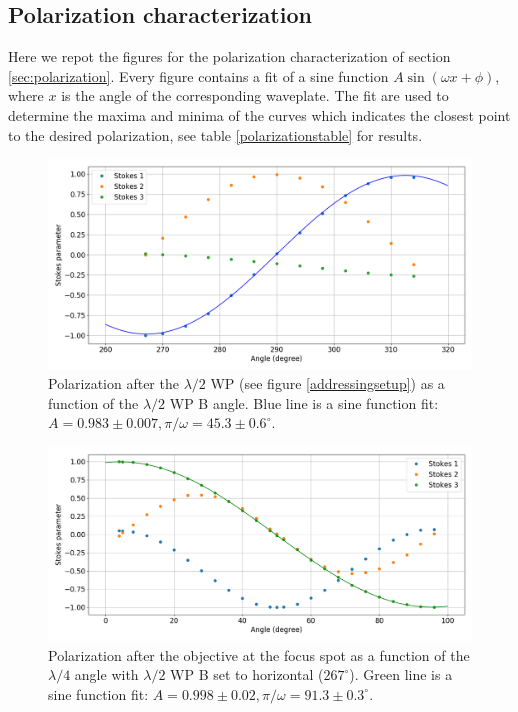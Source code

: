 \documentclass[english, a4paper, 12pt, twoside]{book}
\numberwithin{equation}{section} %
\begin{document}
\begin{appendices}
\chapter{Polarization characterization}
\label{app:polarization}
Here we repot the figures for the polarization characterization of section \ref{sec:polarization}. Every figure contains a fit of a sine function $A\sin(\omega x +\phi)$, where $x$ is the angle of the corresponding waveplate. The fit are used to determine the maxima and minima of the curves which indicates the closest point to the desired polarization, see table \ref{polarizationstable} for results.
\begin{figure}[H]
\centering
\includegraphics[width = \textwidth]{pol3}
\caption{Polarization after the $\lambda/2$ WP (see figure \ref{addressingsetup}) as a function of the $\lambda/2$ WP B angle. Blue line is a sine function fit: $A = 0.983 \pm 0.007, \pi/\omega = 45.3 \pm 0.6^\circ$.}
\label{pol1}
\end{figure}
\begin{figure}[H]
\centering
\includegraphics[width = \textwidth]{pol1}
\caption{Polarization after the objective at the focus spot as a function of the $\lambda/4$ angle with $\lambda/2$ WP B set to horizontal ($267^\circ$). Green line is a sine function fit: $A = 0.998\pm 0.02, \pi/\omega = 91.3\pm0.3^\circ$.}

\end{figure}
\end{appendices}
\end{document}
